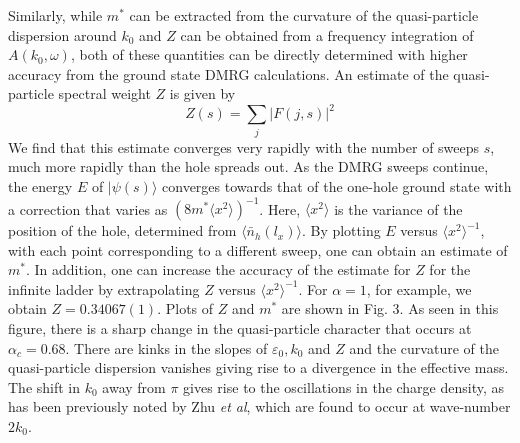 \documentclass[aps,prb,twocolumn]{revtex4}
\def\be{\begin{equation}}       \def\ee{\end{equation}}
\begin{document}
Similarly, while $ m^* $ can be extracted from the curvature of the quasi-particle dispersion around $ k_0 $ 
  and $Z$ can be obtained from a frequency integration 
 of $A(k_0,\omega)$,  both of these quantities can be directly determined with higher accuracy 
from the ground state DMRG calculations. 
An estimate of the quasi-particle spectral weight $Z$ is given by
\be
Z(s) = \sum_j
%
| F(j,s)|^2
\ee
We find that this estimate converges very rapidly with the number of sweeps
$s$, much more rapidly than the hole
spreads out.  As the DMRG sweeps continue, 
the energy $E$ of $|\psi(s)\rangle $ converges towards that of the one-hole ground state
with a correction that varies as $ (8m^*\langle x^2\rangle )^{-1} $.  Here, $\langle x^2\rangle  $ is the
variance of the position of the hole, determined from $\langle \bar n_h(l_x) \rangle$.  %
By 
plotting $E$ versus $\langle x^2\rangle ^{-1}$, with each point corresponding to a different sweep, 
one can obtain an estimate of $m^*$.  In addition, one can increase the accuracy of the estimate for $Z$
for the infinite ladder by extrapolating $Z$ versus $\langle x^2\rangle ^{-1}$.
For $\alpha=1$, for example, we obtain $Z = 0.34067(1)$.
Plots of $Z$ and $m^*$ are shown in Fig. 3.  
As seen in this figure, there is a sharp change in the quasi-particle character that
occurs at $\alpha_c = 0.68$. There are kinks in the slopes of $\varepsilon_0,k_0 $ and $Z$ 
and the curvature of the quasi-particle dispersion vanishes giving rise to a
divergence in the effective mass. The shift in $k_0$ away from $\pi$ gives rise to the
oscillations in the charge density, as has been previously noted by Zhu {\it et al}, 
which are found to occur at wave-number $2k_0$.
\end{document}
